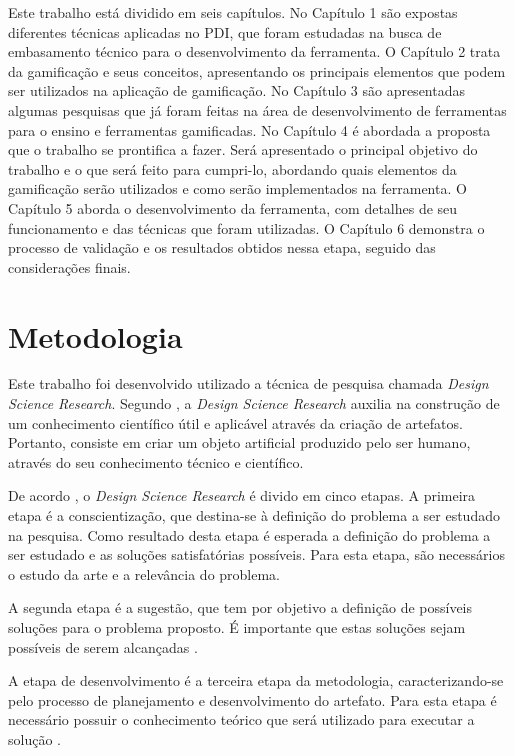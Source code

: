 \documentclass[
	12pt,				%
	oneside,			%
	a4paper,			%
	english,			%
	french,				%
	spanish,			%
	brazil,				%
	]{abntex2}
\begin{document}
Este trabalho está dividido em seis capítulos. No Capítulo 1 são expostas diferentes técnicas aplicadas no PDI, que foram estudadas na busca de embasamento técnico para o desenvolvimento da ferramenta. O Capítulo 2 trata da gamificação e seus conceitos, apresentando os principais elementos que podem ser utilizados na aplicação de gamificação. No Capítulo 3 são apresentadas algumas pesquisas que já foram feitas na área de desenvolvimento de ferramentas para o ensino e ferramentas gamificadas. No Capítulo 4 é abordada a proposta que o trabalho se prontifica a fazer. Será apresentado o principal objetivo do trabalho e o que será feito para cumpri-lo, abordando quais elementos da gamificação serão utilizados e como serão implementados na ferramenta. O Capítulo 5 aborda o desenvolvimento da ferramenta, com detalhes de seu funcionamento e das técnicas que foram utilizadas. O Capítulo 6 demonstra o processo de validação e os resultados obtidos nessa etapa, seguido das considerações finais.

\chapter{Metodologia}

Este trabalho foi desenvolvido utilizado a técnica de pesquisa chamada \textit{Design Science Research}. Segundo \citet{dresch:2015}, a \textit{Design
Science Research} auxilia na construção de um conhecimento científico útil e aplicável através da criação de artefatos. Portanto, consiste em criar um objeto artificial produzido pelo ser humano, através do seu conhecimento técnico e científico.

De acordo \citet{dresch:2015}, o \textit{Design
Science Research} é divido em cinco etapas. A primeira etapa é a conscientização, que destina-se à definição do problema a ser estudado na pesquisa. Como resultado desta etapa é esperada a definição do problema a ser estudado e as soluções satisfatórias possíveis. Para esta etapa, são necessários o estudo da arte e a relevância do problema.

A segunda etapa é a sugestão, que tem por objetivo a definição de possíveis soluções para o problema proposto. É importante que estas soluções sejam  possíveis de serem alcançadas \cite{dresch:2015}.

A etapa de desenvolvimento é a terceira etapa da metodologia, caracterizando-se pelo processo de planejamento e desenvolvimento do artefato. Para esta etapa é necessário possuir o conhecimento teórico que será utilizado para executar a solução \cite{dresch:2015}.
\end{document}
